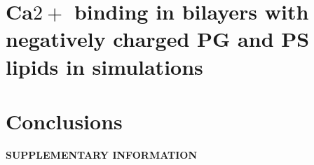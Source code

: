 \documentclass[aps,prl,superscriptaddress,twocolumn]{revtex4}
\begin{document}
\section{Ca$2+$ binding in bilayers with negatively charged PG and PS lipids in simulations}


\section{Conclusions}

%

\begin{acknowledgments}
\end{acknowledgments}
\newpage
\appendix
\begin{center}
{\bf SUPPLEMENTARY INFORMATION}
\end{center}





\listoftodos
\end{document}
